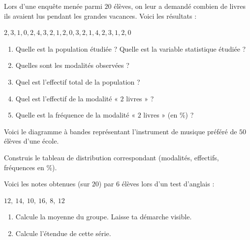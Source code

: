 \documentclass[../../syllabus_1.tex]{subfiles}
\begin{document}
\begin{exercise}
    Lors d'une enquête menée parmi $20$ élèves, on leur a demandé combien de livres ils avaient lus pendant les grandes vacances. Voici les résultats :
    \begin{center}
        $2, 3, 1, 0, 2, 4, 3, 2, 1, 2, 0, 3, 2, 1, 4, 2, 3, 1, 2, 0$
    \end{center}
    \begin{enumerate}
        \item Quelle est la population étudiée ? Quelle est la variable statistique étudiée ?
        \item Quelles sont les modalités observées ?
        \item Quel est l'effectif total de la population ?
        \item Quel est l'effectif de la modalité « $2$ livres » ?
        \item Quelle est la fréquence de la modalité « $2$ livres » (en \%) ?
    \end{enumerate}
\end{exercise}

\begin{exercise}
    Voici le diagramme à bandes représentant l'instrument de musique préféré de $50$ élèves d'une école.
    \begin{center}
    \end{center}
    Construis le tableau de distribution correspondant (modalités, effectifs, fréquences en \%).
\end{exercise}

\begin{exercise}
    Voici les notes obtenues (sur $20$) par $6$ élèves lors d'un test d'anglais :
    \begin{center}
        $12, \ 14, \ 10, \ 16, \ 8, \ 12$
    \end{center}
    \begin{enumerate}
        \item Calcule la moyenne du groupe. Laisse ta démarche visible.
        \item Calcule l'étendue de cette série.
    \end{enumerate}
\end{exercise}
\end{document}
